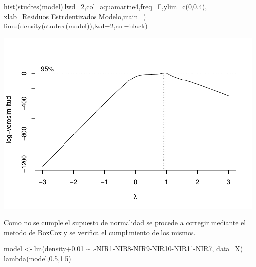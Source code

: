 \documentclass[
]{article}
\newenvironment{Shaded}{\begin{snugshade}}{\end{snugshade}}
\newcommand{\AttributeTok}[1]{\textcolor[rgb]{0.77,0.63,0.00}{#1}}
\newcommand{\DecValTok}[1]{\textcolor[rgb]{0.00,0.00,0.81}{#1}}
\newcommand{\FloatTok}[1]{\textcolor[rgb]{0.00,0.00,0.81}{#1}}
\newcommand{\FunctionTok}[1]{\textcolor[rgb]{0.00,0.00,0.00}{#1}}
\newcommand{\NormalTok}[1]{#1}
\newcommand{\OtherTok}[1]{\textcolor[rgb]{0.56,0.35,0.01}{#1}}
\newcommand{\SpecialCharTok}[1]{\textcolor[rgb]{0.00,0.00,0.00}{#1}}
\newcommand{\StringTok}[1]{\textcolor[rgb]{0.31,0.60,0.02}{#1}}
\begin{document}
\begin{Shaded}
\begin{Highlighting}[]
\FunctionTok{hist}\NormalTok{(}\FunctionTok{studres}\NormalTok{(model),}\AttributeTok{lwd=}\DecValTok{2}\NormalTok{,}\AttributeTok{col=}\StringTok{\textquotesingle{}aquamarine4\textquotesingle{}}\NormalTok{,}\AttributeTok{freq=}\NormalTok{F,}\AttributeTok{ylim=}\FunctionTok{c}\NormalTok{(}\DecValTok{0}\NormalTok{,}\FloatTok{0.4}\NormalTok{),}
     \AttributeTok{xlab=}\StringTok{\textquotesingle{}Residuos Estudentizados Modelo\textquotesingle{}}\NormalTok{,}\AttributeTok{main=}\StringTok{\textquotesingle{}\textquotesingle{}}\NormalTok{)}
\FunctionTok{lines}\NormalTok{(}\FunctionTok{density}\NormalTok{(}\FunctionTok{studres}\NormalTok{(model)),}\AttributeTok{lwd=}\DecValTok{2}\NormalTok{,}\AttributeTok{col=}\StringTok{\textquotesingle{}black\textquotesingle{}}\NormalTok{)}
\end{Highlighting}
\end{Shaded}

\includegraphics{Taller-2-Regresion-Multiple-Aplicada_files/figure-latex/unnamed-chunk-5-1.pdf}

Como no se cumple el supuesto de normalidad se procede a corregir
mediante el metodo de BoxCox y se verifica el cumplimiento de los
mismos.

\begin{Shaded}
\begin{Highlighting}[]
\NormalTok{model }\OtherTok{\textless{}{-}} \FunctionTok{lm}\NormalTok{(density}\FloatTok{+0.01} \SpecialCharTok{\textasciitilde{}}\NormalTok{ .}\SpecialCharTok{{-}}\NormalTok{NIR1}\SpecialCharTok{{-}}\NormalTok{NIR8}\SpecialCharTok{{-}}\NormalTok{NIR9}\SpecialCharTok{{-}}\NormalTok{NIR10}\SpecialCharTok{{-}}\NormalTok{NIR11}\SpecialCharTok{{-}}\NormalTok{NIR7, }\AttributeTok{data=}\NormalTok{X)}
\FunctionTok{lambda}\NormalTok{(model,}\FloatTok{0.5}\NormalTok{,}\FloatTok{1.5}\NormalTok{)}
\end{Highlighting}
\end{Shaded}
\end{document}
